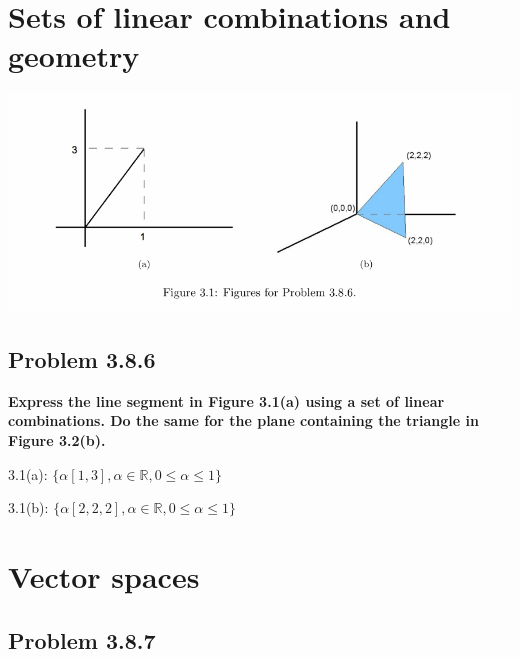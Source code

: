 \documentclass[
  letterpaper,
  DIV=11,
  numbers=noendperiod]{scrartcl}
\author{}
\date{}
\renewcommand*\contentsname{Table of contents}
\newcommand\contentsname{Table of contents}
\begin{document}

\newpage

\ifdefined\Shaded\renewenvironment{Shaded}{\begin{tcolorbox}[boxrule=0pt, borderline west={3pt}{0pt}{shadecolor}, frame hidden, breakable, enhanced, interior hidden, sharp corners]}{\end{tcolorbox}}\fi

\renewcommand*\contentsname{Table of contents}
{
\hypersetup{linkcolor=}
\setcounter{tocdepth}{4}
\tableofcontents
}
\newpage{}

\hypertarget{sets-of-linear-combinations-and-geometry}{%
\section{Sets of linear combinations and
geometry}\label{sets-of-linear-combinations-and-geometry}}

\includegraphics{Figure 3.1.png}

\hypertarget{problem-3.8.6}{%
\subsection{Problem 3.8.6}\label{problem-3.8.6}}

\textbf{Express the line segment in Figure 3.1(a) using a set of linear
combinations. Do the same for the plane containing the triangle in
Figure 3.2(b).}

3.1(a): \(\{\alpha[1, 3], \alpha \in \mathbb{R}, 0 \le \alpha \le 1 \}\)

3.1(b):
\(\{\alpha[2, 2, 2], \alpha \in \mathbb{R}, 0 \le \alpha \le 1 \}\)

\newpage{}

\hypertarget{vector-spaces}{%
\section{Vector spaces}\label{vector-spaces}}

\hypertarget{problem-3.8.7}{%
\subsection{Problem 3.8.7}\label{problem-3.8.7}}
\end{document}
